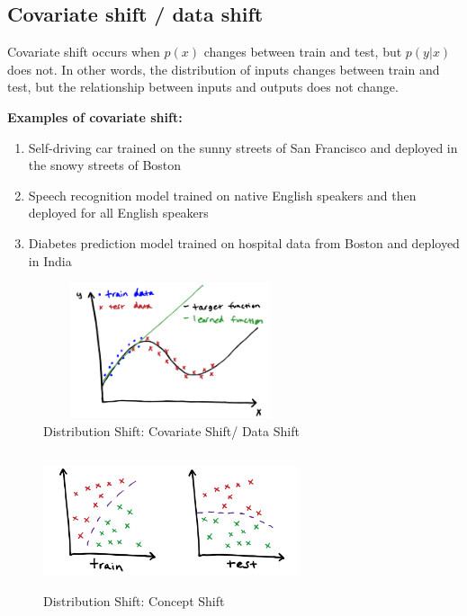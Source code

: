 \subsection{Covariate shift / data shift}\label{Covariate shift / data shift}
Covariate shift occurs when $p(x)$ changes between train and test, but $p(y|x)$ does not. In other words, the distribution of inputs changes between train and test, but the relationship between inputs and outputs does not change.

\vspace{0.2cm}
\textbf{Examples of covariate shift:}
\begin{enumerate}
    \item Self-driving car trained on the sunny streets of San Francisco and deployed in the snowy streets of Boston
    \item Speech recognition model trained on native English speakers and then deployed for all English speakers
    \item Diabetes prediction model trained on hospital data from Boston and deployed in India
\end{enumerate}

\begin{table}[H]
    \begin{minipage}{0.45\textwidth}
        \begin{figure}[H]
            \centering
            \includegraphics[width=7.5cm,height=4cm]{Pictures/ml-data/ml-data-covariate-shift.jpg}
            \caption{Distribution Shift: Covariate Shift/ Data Shift}
        \end{figure}
    \end{minipage}
    \hfill
    \begin{minipage}{0.45\textwidth}
        \begin{figure}[H]
            \centering
            \includegraphics[width=7.5cm,height=4cm]{Pictures/ml-data/ml-data-concept-shift.jpg}
            \caption{Distribution Shift: Concept Shift}
        \end{figure}
    \end{minipage}
\end{table}

